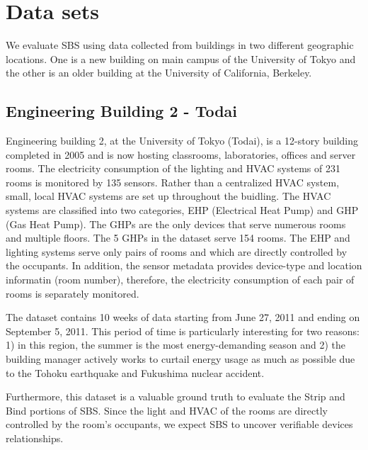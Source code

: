 \section{Data sets}
We evaluate SBS using data collected from buildings in two different geographic locations.  
One is a new building on main campus of the University of Tokyo and the other is an older building at 
the University of California, Berkeley.

\subsection{Engineering Building 2 - Todai}\label{data:engbldg2}
Engineering building 2, at the University of Tokyo (Todai), is a 12-story building completed in 2005 and is now 
hosting classrooms, laboratories, offices 
and server rooms.  
The electricity consumption of the lighting and HVAC systems of 231 rooms is monitored by 135 sensors.
Rather than a centralized HVAC system, small, local HVAC systems are set up throughout the buidling.  
The HVAC systems are classified into two categories, EHP (Electrical Heat Pump) and GHP (Gas Heat Pump).
The GHPs are the only devices that serve numerous rooms and multiple floors.  The 5 GHPs in the dataset serve 154 rooms.
The EHP and lighting systems serve only pairs of rooms and which are directly controlled by the occupants.
In addition, the sensor metadata provides device-type and location informatin (room number), 
therefore, the electricity consumption of each pair of rooms is separately monitored.

The dataset contains 10 weeks of data starting from June 27, 2011 and ending on September 5, 2011.
This period of time is particularly interesting for two reasons: 1) in this region, the summer is the most energy-demanding 
season and 2) the building manager actively works to curtail energy usage as much as possible due to the 
Tohoku earthquake and Fukushima nuclear accident.

Furthermore, this dataset is a valuable ground truth to evaluate the Strip and Bind portions of SBS.
Since the light and HVAC of the rooms are directly controlled by the room's occupants, we expect SBS to uncover verifiable devices 
relationships.  


